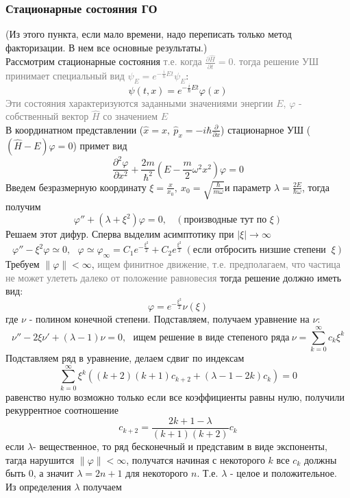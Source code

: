 		\subsubsection{Стационарные состояния ГО}
			(Из этого пункта, если мало времени, надо переписать только метод факторизации. В нем все основные результаты.)\\
			Рассмотрим стационарные состояния \textcolor{gray}{т.е. когда $\frac{\partial\hat{H}}{\partial t} = 0$. тогда решение УШ принимает специальный вид $\psi_E = e^{-\frac{i}{\hbar}Et}\psi_E$}:
			$$
				\psi(t, x) = e^{-\frac{i}{\hbar}Et}\varphi(x)
			$$
			\textcolor{gray}{Эти состояния характеризуются заданными значениями энергии $E$, $\varphi$ - собственный вектор $\hat{H}$ со значением $E$}\\
			В координатном представлении ($\hat{x} = x,\ \hat{p}_x = -i\hbar\frac{\partial}{\partial x}$) стационарное УШ ($(\hat{H} - E) \varphi = 0$) примет вид
			$$
				\frac{\partial^2\varphi}{\partial x^2}+\frac{2m}{\hbar^2}\left(E-\frac{m}{2}\omega^2x^2\right)\varphi = 0
			$$
			Введем безразмерную координату $\xi = \frac{x}{x_0}, \ x_0 = \sqrt{\frac{\hbar}{m\omega}}$и параметр $\lambda = \frac{2E}{\hbar\omega}$, тогда получим
			$$
				\varphi'' + (\lambda + \xi^2)\varphi = 0, \ \ \ \ (\text{производные тут по } \xi)
			$$
			Решаем этот дифур. Сперва выделим асимптотику при $|\xi|\rightarrow\infty$
			$$
				\varphi''-\xi^2\varphi\simeq0, \ \ \ \varphi\simeq\varphi_{\infty}=C_1e^{-\frac{\xi^2}{2}}+C_2e^{\frac{\xi^2}{2}} \ (\text{если отбросить низшие степени }\ \xi)
			$$
			Требуем $\|\varphi\|<\infty$, \textcolor{gray}{ищем финитное движение, т.е. предполагаем, что частица не может улететь далеко от положение равновесия} тогда решение должно иметь вид:
			$$
				\varphi = e^{-\frac{\xi^2}{2}}\nu(\xi)
			$$
			где $\nu$ - полином конечной степени. Подставляем, получаем уравнение на $\nu$:
			$$
				\nu''-2\xi\nu'+(\lambda-1)\nu = 0, \ \ \ \text{ищем решение в виде степеного ряда} \ \nu = \sum_{k = 0}^{\infty}c_k\xi^k
			$$
			Подставляем ряд в уравнение, делаем сдвиг по индексам
			$$
				\sum_{k = 0}^{\infty}\xi^k((k+2)(k+1)c_{k+2}+(\lambda - 1- 2k)c_k) = 0
			$$
			равенство нулю возможно только если все коэффициенты равны нулю, получили рекуррентное соотношение
			$$
				c_{k+2}=\frac{2k+1-\lambda}{(k+1)(k+2)}c_k
			$$
			если $\lambda$- вещественное, то ряд бесконечный и представим в виде экспоненты, тагда нарушится $\|\varphi\|<\infty$, получатся начиная с некоторого $k$ все $c_k$ должны быть 0, а значит $\lambda = 2n+1$ для некоторого $n$. Т.е. $\lambda$ - целое и положительное. Из определения $\lambda$ получаем
